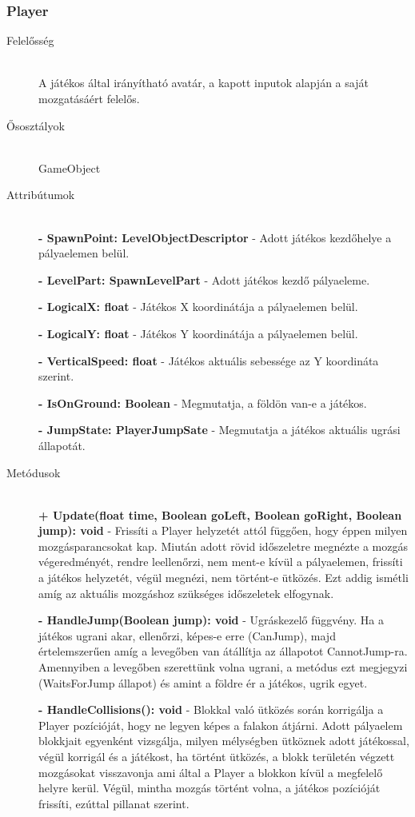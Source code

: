 \subsubsection{Player}
	\begin{description}
		\item[Felelősség] \hfill \\
		A játékos által irányítható avatár, a kapott inputok alapján a saját mozgatásáért felelős.
		
		\item[Ősosztályok]\hfill \\
		GameObject

		\item[Attribútumok] \hfill \\
		\textbf{- SpawnPoint: LevelObjectDescriptor} - Adott játékos kezdőhelye a pályaelemen belül.

		\textbf{- LevelPart: SpawnLevelPart} - Adott játékos kezdő pályaeleme.

		\textbf{- LogicalX: float} - Játékos X koordinátája a pályaelemen belül.

		\textbf{- LogicalY: float} - Játékos Y koordinátája a pályaelemen belül.

		\textbf{- VerticalSpeed: float} - Játékos aktuális sebessége az Y koordináta szerint.

		\textbf{- IsOnGround: Boolean} - Megmutatja, a földön van-e a játékos.

		\textbf{- JumpState: PlayerJumpSate} - Megmutatja a játékos aktuális ugrási állapotát.
		
		\item[Metódusok]\hfill \\
		\textbf{+ Update(float time, Boolean goLeft, Boolean goRight, Boolean jump): void} - Frissíti a Player helyzetét attól függően, hogy éppen milyen mozgásparancsokat kap. Miután adott rövid időszeletre megnézte a mozgás végeredményét, rendre leellenőrzi, nem ment-e kívül a pályaelemen, frissíti a játékos helyzetét, végül megnézi, nem történt-e ütközés. Ezt addig ismétli amíg az aktuális mozgáshoz szükséges időszeletek elfogynak.
		
		\textbf{- HandleJump(Boolean jump): void} - Ugráskezelő függvény. Ha a játékos ugrani akar, ellenőrzi, képes-e erre (CanJump), majd értelemszerűen amíg a levegőben van átállítja az állapotot CannotJump-ra. Amennyiben a levegőben szerettünk volna ugrani, a metódus ezt megjegyzi (WaitsForJump állapot) és amint a földre ér a játékos, ugrik egyet.

		\textbf{- HandleCollisions(): void} - Blokkal való ütközés során korrigálja a Player pozícióját, hogy ne legyen képes a falakon átjárni. Adott pályaelem blokkjait egyenként vizsgálja, milyen mélységben ütköznek adott játékossal, végül korrigál és a játékost, ha történt ütközés, a blokk területén végzett mozgásokat visszavonja ami által a Player a blokkon kívül a megfelelő helyre kerül. Végül, mintha mozgás történt volna, a játékos pozícióját frissíti, ezúttal pillanat szerint.


\end{description}
